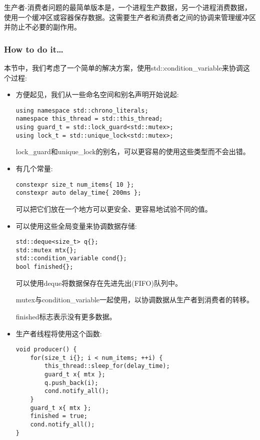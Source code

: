 
生产者-消费者问题的最简单版本是，一个进程生产数据，另一个进程消费数据，使用一个缓冲区或容器保存数据。这需要生产者和消费者之间的协调来管理缓冲区并防止不必要的副作用。

\subsubsection{How to do it…}

本节中，我们考虑了一个简单的解决方案，使用std::condition\_variable来协调这个过程:

\begin{itemize}
\item 
方便起见，我们从一些命名空间和别名声明开始说起:

\begin{lstlisting}[style=styleCXX]
using namespace std::chrono_literals;
namespace this_thread = std::this_thread;
using guard_t = std::lock_guard<std::mutex>;
using lock_t = std::unique_lock<std::mutex>;
\end{lstlisting}

lock\_guard和unique\_lock的别名，可以更容易的使用这些类型而不会出错。

\item 
有几个常量:

\begin{lstlisting}[style=styleCXX]
constexpr size_t num_items{ 10 };
constexpr auto delay_time{ 200ms };
\end{lstlisting}

可以把它们放在一个地方可以更安全、更容易地试验不同的值。

\item 
可以使用这些全局变量来协调数据存储:

\begin{lstlisting}[style=styleCXX]
std::deque<size_t> q{};
std::mutex mtx{};
std::condition_variable cond{};
bool finished{};
\end{lstlisting}

可以使用deque将数据保存在先进先出(FIFO)队列中。

mutex与condition\_variable一起使用，以协调数据从生产者到消费者的转移。

finished标志表示没有更多数据。

\item 
生产者线程将使用这个函数:

\begin{lstlisting}[style=styleCXX]
void producer() {
	for(size_t i{}; i < num_items; ++i) {
		this_thread::sleep_for(delay_time);
		guard_t x{ mtx };
		q.push_back(i);
		cond.notify_all();
	}
	guard_t x{ mtx };
	finished = true;
	cond.notify_all();
}
\end{lstlisting}


\end{itemize}
